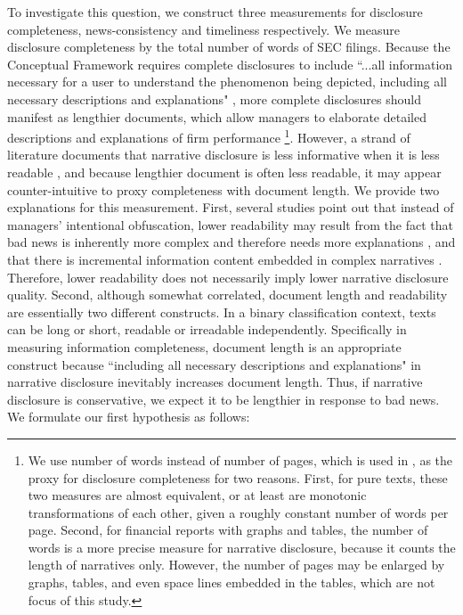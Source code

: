 \documentclass[a4paper]{article}
\begin{document}
\begin{spacing}{2}
To investigate this question, we construct three measurements for disclosure completeness, news-consistency and timeliness respectively. We measure disclosure completeness by the total number of words of SEC filings. Because the Conceptual Framework requires complete disclosures to include ``...all information necessary for a user to understand the phenomenon being depicted, including all necessary descriptions and explanations" \citep*[QC12]{fasbConceptualFrameworkFinancial2018}, more complete disclosures should manifest as lengthier documents, which allow managers to elaborate detailed descriptions and explanations of firm performance \citep{leuzDisclosureCostCapital2009}\footnote{We use number of words instead of number of pages, which is used in \citet{leuzDisclosureCostCapital2009}, as the proxy for disclosure completeness for two reasons. First, for pure texts, these two measures are almost equivalent, or at least are monotonic transformations of each other, given a roughly constant number of words per page. Second, for financial reports with graphs and tables, the number of words is a more precise measure for narrative disclosure, because it counts the length of narratives only. However, the number of pages may be enlarged by graphs, tables, and even space lines embedded in the tables, which are not focus of this study.}. However, a strand of literature documents that narrative disclosure is less informative when it is less readable \citep*{liAnnualReportReadability2008, loEarningsManagementAnnual2017, loughranMeasuringReadabilityFinancial2014}, and because lengthier document is often less readable, it may appear counter-intuitive to proxy completeness with document length. We provide two explanations for this measurement. First, several studies point out that instead of managers' intentional obfuscation, lower readability may result from the fact that bad news is inherently more complex and therefore needs more explanations \citep*{bloomfieldDiscussionAnnualReport2008}, and that there is incremental information content embedded in complex narratives \citep*{busheeLinguisticComplexityFirm2018}. Therefore, lower readability does not necessarily imply lower narrative disclosure quality. Second, although somewhat correlated, document length and readability are essentially two different constructs. In a binary classification context, texts can be long or short, readable or irreadable independently. Specifically in measuring information completeness, document length is an appropriate construct because ``including all necessary descriptions and explanations" \citep*[QC12]{fasbConceptualFrameworkFinancial2018} in narrative disclosure inevitably increases document length. Thus, if narrative disclosure is conservative, we expect it to be lengthier in response to bad news. We formulate our first hypothesis as follows:


\end{spacing}
\end{document}
